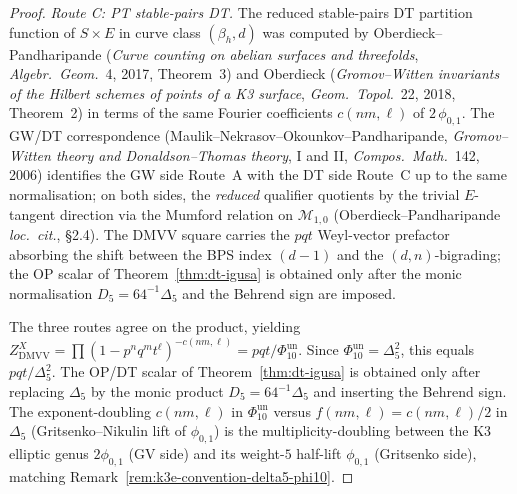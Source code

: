 \begin{proof}
\emph{Route C: PT stable-pairs DT.} The reduced stable-pairs DT
partition function of $S \times E$ in curve class $(\beta_h, d)$ was
computed by Oberdieck--Pandharipande
(\emph{Curve counting on abelian surfaces and threefolds}, \emph{Algebr.\ Geom.}~4, 2017,
Theorem~3) and Oberdieck (\emph{Gromov--Witten invariants of the
Hilbert schemes of points of a K3 surface}, \emph{Geom.\ Topol.}~22,
2018, Theorem~2) in terms of the same Fourier coefficients $c(nm, \ell)$
of $2\,\phi_{0,1}$. The GW/DT correspondence (Maulik--Nekrasov--Okounkov--Pandharipande,
\emph{Gromov--Witten theory and Donaldson--Thomas theory}, I and II,
\emph{Compos.\ Math.}~142, 2006) identifies the GW side Route~A with
the DT side Route~C up to the same normalisation; on both sides, the
\emph{reduced} qualifier quotients by the trivial $E$-tangent direction
via the Mumford relation on $\mathcal{M}_{1,0}$ (Oberdieck--Pandharipande
\emph{loc.\ cit.}, \S2.4). The DMVV square carries the \(pqt\)
Weyl-vector prefactor absorbing the shift between the BPS index
\((d - 1)\) and the \((d,n)\)-bigrading; the OP scalar of
Theorem~\ref{thm:dt-igusa} is obtained only after the monic
normalisation \(D_5=64^{-1}\Delta_5\) and the Behrend sign are imposed.

The three routes agree on the product, yielding
$Z^X_{\mathrm{DMVV}} = \prod (1 - p^n q^m t^\ell)^{-c(nm, \ell)} = pqt/\Phi_{10}^{\mathrm{un}}$.
Since \(\Phi_{10}^{\mathrm{un}}=\Delta_5^2\), this equals
\(pqt/\Delta_5^2\). The OP/DT scalar of Theorem~\ref{thm:dt-igusa}
is obtained only after replacing \(\Delta_5\) by the monic product
\(D_5=64^{-1}\Delta_5\) and inserting the Behrend sign. The exponent-doubling
$c(nm, \ell)$ in \(\Phi_{10}^{\mathrm{un}}\) versus $f(nm, \ell) = c(nm, \ell)/2$ in
$\Delta_5$ (Gritsenko--Nikulin lift of $\phi_{0,1}$) is the
multiplicity-doubling between the K3 elliptic genus $2\phi_{0,1}$ (GV
side) and its weight-$5$ half-lift $\phi_{0,1}$ (Gritsenko side),
matching Remark~\ref{rem:k3e-convention-delta5-phi10}.
\end{proof}

